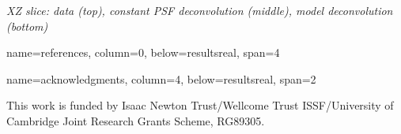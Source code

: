 \documentclass[a0paper,portrait,fontscale=0.35]{baposter}
\newcommand{\mycaption}[1]{
  {
    \smaller
    \emph{#1}
  }
}
\theoremstyle{plain}
\theoremstyle{plain}
\theoremstyle{definition}
\theoremstyle{plain}
\theoremstyle{definition}
\begin{document}
\begin{poster}
{\begin{minipage}[t]{0.33\textwidth}
\begin{minipage}[t]{0.75\textwidth}
      \vspace{-1em}
      \begin{center}
        \mycaption{
          XZ slice: data (top), constant PSF deconvolution (middle),
          model deconvolution (bottom)
        }
      \end{center}
    \end{minipage}
  \end{minipage}
  \vspace{-0.5em}
}

{name=references, column=0,  below=resultsreal, span=4}
{
  \tiny
  \renewcommand{\section}[2]{\vspace{0.01em}}	%
  
}

{name=acknowledgments, column=4, below=resultsreal, span=2}
{  
  \scriptsize
  This work is funded by 
  Isaac Newton Trust/Wellcome Trust ISSF/University of Cambridge 
  Joint Research Grants Scheme, RG89305.

  \par
}






\end{poster}
\end{document}
